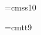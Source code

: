 \font\secfont=cmss10
\def\section #1{
  \vskip\baselineskip
  \noindent{\secfont{}#1}
  \hfill\vskip\baselineskip
  \everypar={{\setbox0\lastbox}\everypar={}}}

%
\font\ninett=cmtt9
\def\symbol{\begingroup\catcode`\_=12\relax\symbolimpl}
\def\symbolimpl#1{{\ninett #1}\endgroup}

\def\notespagesize{\hsize=5in{}\vsize=7in}
